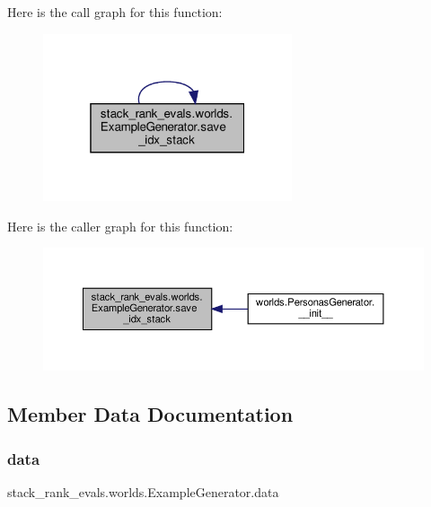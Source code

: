 Here is the call graph for this function\+:
\nopagebreak
\begin{figure}[H]
\begin{center}
\leavevmode
\includegraphics[width=208pt]{classstack__rank__evals_1_1worlds_1_1ExampleGenerator_a47a988958641b4906b2d374938974cca_cgraph}
\end{center}
\end{figure}
Here is the caller graph for this function\+:
\nopagebreak
\begin{figure}[H]
\begin{center}
\leavevmode
\includegraphics[width=350pt]{classstack__rank__evals_1_1worlds_1_1ExampleGenerator_a47a988958641b4906b2d374938974cca_icgraph}
\end{center}
\end{figure}


\subsection{Member Data Documentation}
\mbox{\label{classstack__rank__evals_1_1worlds_1_1ExampleGenerator_a5a7c0e1dffc812f2e3c63c2762d247ae}} 
\subsubsection{\texorpdfstring{data}{data}}
{\footnotesize\ttfamily stack\+\_\+rank\+\_\+evals.\+worlds.\+Example\+Generator.\+data}



